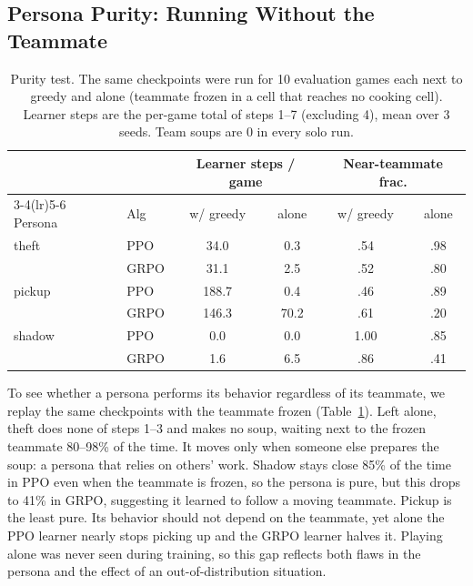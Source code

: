 \documentclass[letterpaper]{article} %
\begin{document}
\subsection{Persona Purity: Running Without the Teammate}
\begin{table}[t]
\centering
\small
\setlength{\tabcolsep}{3.5pt}
\begin{tabular}{@{}llcccc@{}}
\toprule
 & & \multicolumn{2}{c}{Learner steps / game} & \multicolumn{2}{c}{Near-teammate frac.} \\
\cmidrule(lr){3-4}\cmidrule(lr){5-6}
Persona & Alg & w/ greedy & alone & w/ greedy & alone \\
\midrule
theft & PPO & 34.0 & 0.3 & .54 & .98 \\
 & GRPO & 31.1 & 2.5 & .52 & .80 \\
pickup & PPO & 188.7 & 0.4 & .46 & .89 \\
 & GRPO & 146.3 & 70.2 & .61 & .20 \\
shadow & PPO & 0.0 & 0.0 & 1.00 & .85 \\
 & GRPO & 1.6 & 6.5 & .86 & .41 \\
\bottomrule
\end{tabular}
\caption{Purity test. The same checkpoints were run for 10 evaluation games each next to greedy and
alone (teammate frozen in a cell that reaches no cooking cell). Learner steps are the per-game total of
steps 1--7 (excluding 4), mean over 3 seeds. Team soups are 0 in every solo run.}
\label{tab:solo}
\end{table}

To see whether a persona performs its behavior regardless of its teammate, we replay the same
checkpoints with the teammate frozen (Table~\ref{tab:solo}). Left alone, theft does none of steps 1--3
and makes no soup, waiting next to the frozen teammate 80--98\% of the time. It moves only when someone
else prepares the soup: a persona that relies on others' work. Shadow stays close 85\% of the time in PPO
even when the teammate is frozen, so the persona is pure, but this drops to 41\% in GRPO, suggesting it
learned to follow a moving teammate. Pickup is the least pure. Its behavior should not depend on the
teammate, yet alone the PPO learner nearly stops picking up and the GRPO learner halves it. Playing
alone was never seen during training, so this gap reflects both flaws in the persona and the effect of
an out-of-distribution situation.
\end{document}
